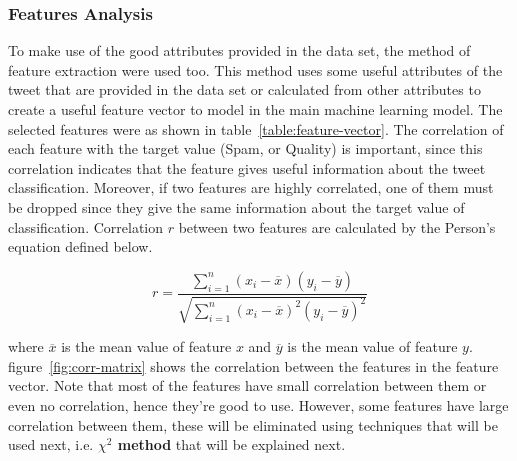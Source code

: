 \documentclass[conference]{IEEEtran}
\begin{document}
\subsubsection{Features Analysis}
To make use of the good attributes provided in the data set, the method of feature extraction were used too. This method uses some useful attributes of the tweet that are provided in the data set or calculated from other attributes to create a useful feature vector to model in the main machine learning model. The selected features were as shown in table~\ref{table:feature-vector}. The correlation of each feature with the target value (Spam, or Quality) is important, since this correlation indicates that the feature gives useful information about the tweet classification. Moreover, if two features are highly correlated, one of them must be dropped since they give the same information about the target value of classification. Correlation $r$ between two features are calculated by the Person's equation defined below.

\begin{equation}
    r = \frac{{}\sum_{i=1}^{n} (x_i - \overline{x})(y_i - \overline{y})}
{\sqrt{\sum_{i=1}^{n} (x_i - \overline{x})^2(y_i - \overline{y})^2}}
\end{equation}

where $\overline{x}$ is the mean value of feature $x$ and $\overline{y}$ is the mean value of feature $y$. figure~\ref{fig:corr-matrix} shows the correlation between the features in the feature vector. Note that most of the features have small correlation between them or even no correlation, hence they're good to use. However, some features have large correlation between them, these will be eliminated using techniques that will be used next, i.e.  \textbf{$\chi^2$ method} that will be explained next.
\end{document}
